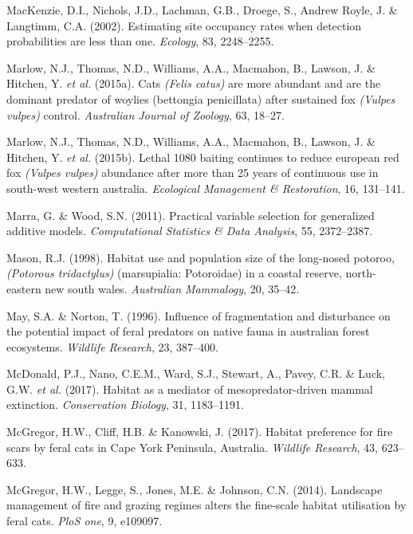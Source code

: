 \documentclass[11pt,a4paper,titlepage,twoside,openright]{style/unimelbthesis}
\begin{document}
\begin{mainmatter}
\leavevmode\hypertarget{ref-mackenzie2002estimating}{}%
MacKenzie, D.I., Nichols, J.D., Lachman, G.B., Droege, S., Andrew Royle, J. \& Langtimm, C.A. (2002). Estimating site occupancy rates when detection probabilities are less than one. \emph{Ecology}, 83, 2248--2255.

\leavevmode\hypertarget{ref-marlow2015cats}{}%
Marlow, N.J., Thomas, N.D., Williams, A.A., Macmahon, B., Lawson, J. \& Hitchen, Y. \emph{et al.} (2015a). Cats \emph{(Felis catus)} are more abundant and are the dominant predator of woylies (bettongia penicillata) after sustained fox \emph{(Vulpes vulpes)} control. \emph{Australian Journal of Zoology}, 63, 18--27.

\leavevmode\hypertarget{ref-marlow2015lethal}{}%
Marlow, N.J., Thomas, N.D., Williams, A.A., Macmahon, B., Lawson, J. \& Hitchen, Y. \emph{et al.} (2015b). Lethal 1080 baiting continues to reduce european red fox \emph{(Vulpes vulpes)} abundance after more than 25 years of continuous use in south-west western australia. \emph{Ecological Management \& Restoration}, 16, 131--141.

\leavevmode\hypertarget{ref-marra2011practical}{}%
Marra, G. \& Wood, S.N. (2011). Practical variable selection for generalized additive models. \emph{Computational Statistics \& Data Analysis}, 55, 2372--2387.

\leavevmode\hypertarget{ref-mason1998habitat}{}%
Mason, R.J. (1998). Habitat use and population size of the long-nosed potoroo, \emph{(Potorous tridactylus)} (marsupialia: Potoroidae) in a coastal reserve, north-eastern new south wales. \emph{Australian Mammalogy}, 20, 35--42.

\leavevmode\hypertarget{ref-may1996influence}{}%
May, S.A. \& Norton, T. (1996). Influence of fragmentation and disturbance on the potential impact of feral predators on native fauna in australian forest ecosystems. \emph{Wildlife Research}, 23, 387--400.

\leavevmode\hypertarget{ref-mcdonald2017habitat}{}%
McDonald, P.J., Nano, C.E.M., Ward, S.J., Stewart, A., Pavey, C.R. \& Luck, G.W. \emph{et al.} (2017). Habitat as a mediator of mesopredator-driven mammal extinction. \emph{Conservation Biology}, 31, 1183--1191.

\leavevmode\hypertarget{ref-mcgregor2017habitat}{}%
McGregor, H.W., Cliff, H.B. \& Kanowski, J. (2017). Habitat preference for fire scars by feral cats in Cape York Peninsula, Australia. \emph{Wildlife Research}, 43, 623--633.

\leavevmode\hypertarget{ref-mcgregor2014landscape}{}%
McGregor, H.W., Legge, S., Jones, M.E. \& Johnson, C.N. (2014). Landscape management of fire and grazing regimes alters the fine-scale habitat utilisation by feral cats. \emph{PloS one}, 9, e109097.


\end{mainmatter}
\end{document}
